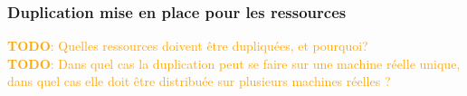 \documentclass[a11paper, 11pt]{article}
\newcommand{\todo}[1]{\textcolor{orange}{\textbf{TODO}: #1}}
\begin{document}
\subsubsection{Duplication mise en place pour les ressources}

\todo{Quelles ressources doivent être dupliquées, et pourquoi?} \\
\todo{Dans quel cas la duplication peut se faire sur une machine réelle unique, dans
quel cas elle doit être distribuée sur plusieurs machines réelles ?}


\end{document}
